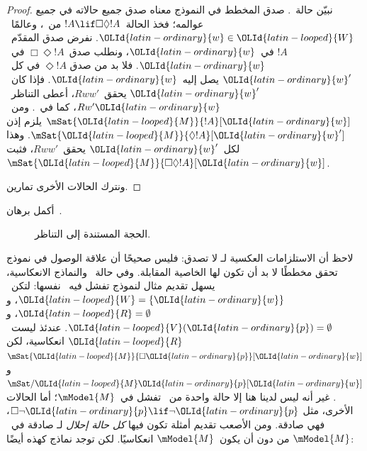 \documentclass[../../../include/open-logic-section]{subfiles}
\begin{document}
\begin{proof}
  نبيّن حالة~. صدق المخطط في النموذج معناه صدق جميع
  حالاته في جميع عوالمه؛ فخذ الحالة~$!A \lif \Box\Diamond !A$
  من~، وعالمًا~$\OLId{latin-ordinary}{w} \in \OLId{latin-looped}{W}$. نفرض صدق المقدّم~$!A$ في~$\OLId{latin-ordinary}{w}$،
  ونطلب صدق~$\Box \Diamond !A$ في~$\OLId{latin-ordinary}{w}$. فلا بد من صدق
  $\Diamond !A$ في كل~$\OLId{latin-ordinary}{w}'$ يصل إليه~$\OLId{latin-ordinary}{w}$.
  فإذا كان~$\OLId{latin-ordinary}{w}'$ يحقق~$Rww'$، أعطى التناظر~$Rw'\OLId{latin-ordinary}{w}$، كما
  في~. ومن~$\mSat{\OLId{latin-looped}{M}}{!A}[\OLId{latin-ordinary}{w}]$ يلزم إذن
  $\mSat{\OLId{latin-looped}{M}}{\Diamond !A}[\OLId{latin-ordinary}{w}']$. وهذا لكل~$\OLId{latin-ordinary}{w}'$ يحقق~$Rww'$،
  فثبت~$\mSat{\OLId{latin-looped}{M}}{\Box\Diamond!A}[\OLId{latin-ordinary}{w}]$.

  ونترك الحالات الأخرى تمارين.
\end{proof}

\begin{prob}
  أكمل برهان~.
\end{prob}

\begin{figure}
  \begin{center}
  \end{center}
\caption{الحجة المستندة إلى التناظر.}
\end{figure}

لاحظ أن الاستلزامات العكسية لـ لا تصدق: فليس
صحيحًا أن علاقة الوصول في نموذج تحقق مخططًا لا بد أن تكون لها الخاصية
المقابلة. وفي حالة~ والنماذج الانعكاسية، يسهل تقديم مثال لنموذج
تفشل فيه~ نفسها: لتكن~$\OLId{latin-looped}{W} = \{\OLId{latin-ordinary}{w}\}$، و$\OLId{latin-looped}{R} = \emptyset$، و
$\OLId{latin-looped}{V}(\OLId{latin-ordinary}{p}) = \emptyset$. عندئذ ليست~$\OLId{latin-looped}{R}$ انعكاسية، لكن
$\mSat{\OLId{latin-looped}{M}}{\Box \OLId{latin-ordinary}{p}}[\OLId{latin-ordinary}{w}]$ و$\mSat/{\OLId{latin-looped}{M}}{\OLId{latin-ordinary}{p}}[\OLId{latin-ordinary}{w}]$. غير أنه ليس لدينا هنا إلا
حالة واحدة من~ تفشل في~$\mModel{M}$؛ أما الحالات الأخرى، مثل
$\Box \lnot \OLId{latin-ordinary}{p} \lif \lnot \OLId{latin-ordinary}{p}$، فهي صادقة. ومن الأصعب تقديم أمثلة تكون
فيها \emph{كل حالة إحلال} لـ صادقة في~$\mModel{M}$ من دون أن
يكون~$\mModel{M}$ انعكاسيًا. لكن توجد نماذج كهذه أيضًا:
\end{document}
